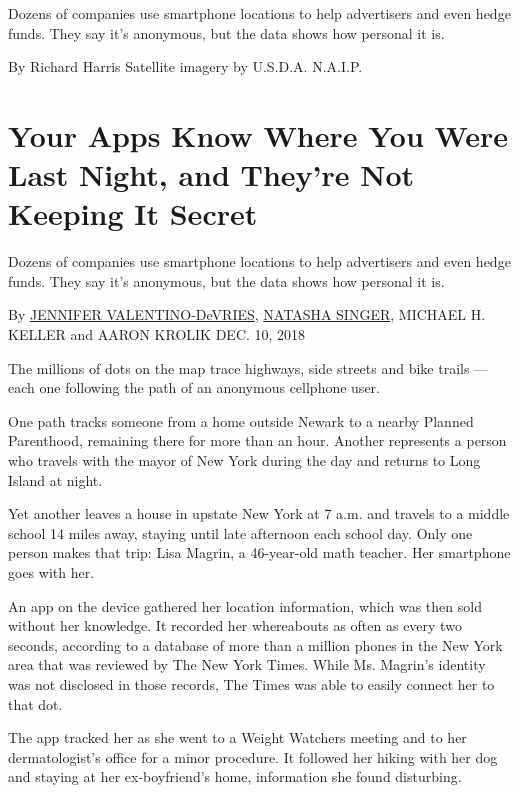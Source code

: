 Dozens of companies use smartphone locations to help advertisers and
even hedge funds. They say it's anonymous, but the data shows how
personal it is.

By Richard Harris \textbar{} Satellite imagery by U.S.D.A. N.A.I.P.

\hypertarget{your-apps-know-where-you-were-last-night-and-theyre-not-keeping-it-secret-1}{%
\section{Your Apps Know Where You Were Last Night, and They're Not
Keeping It
Secret}\label{your-apps-know-where-you-were-last-night-and-theyre-not-keeping-it-secret-1}}

Dozens of companies use smartphone locations to help advertisers and
even hedge funds. They say it's anonymous, but the data shows how
personal it is.

By \href{https://www.nytimes.com/by/jennifer-valentino-devries}{JENNIFER
VALENTINO-DeVRIES},
\href{https://www.nytimes.com/by/natasha-singer}{NATASHA SINGER},
MICHAEL H. KELLER and AARON KROLIK DEC. 10, 2018

The millions of dots on the map trace highways, side streets and bike
trails --- each one following the path of an anonymous cellphone user.

One path tracks someone from a home outside Newark to a nearby Planned
Parenthood, remaining there for more than an hour. Another represents a
person who travels with the mayor of New York during the day and returns
to Long Island at night.

Yet another leaves a house in upstate New York at 7 a.m. and travels to
a middle school 14 miles away, staying until late afternoon each school
day. Only one person makes that trip: Lisa Magrin, a 46-year-old math
teacher. Her smartphone goes with her.

An app on the device gathered her location information, which was then
sold without her knowledge. It recorded her whereabouts as often as
every two seconds, according to a database of more than a million phones
in the New York area that was reviewed by The New York Times. While Ms.
Magrin's identity was not disclosed in those records, The Times was able
to easily connect her to that dot.

The app tracked her as she went to a Weight Watchers meeting and to her
dermatologist's office for a minor procedure. It followed her hiking
with her dog and staying at her ex-boyfriend's home, information she
found disturbing.

